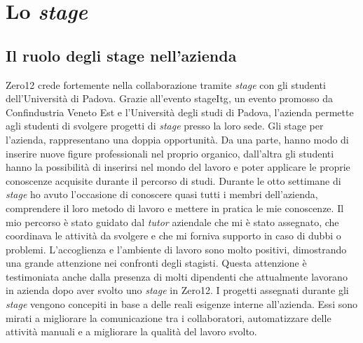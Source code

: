 
\chapter{Lo \textit{stage}}
\label{cap:lo-stage}



\section{Il ruolo degli stage nell'azienda}
Zero12 crede fortemente nella collaborazione tramite \textit{stage} con gli studenti dell'Università di Padova. Grazie all'evento \gls{stageItg}, un evento promosso da Confindustria Veneto Est e l'Università degli studi di Padova, l'azienda permette agli studenti di svolgere progetti di \textit{stage} presso la loro sede.
Gli stage per l'azienda, rappresentano una doppia opportunità. Da una parte, hanno modo di inserire nuove figure professionali nel proprio organico, dall’altra gli studenti hanno la possibilità di inserirsi nel mondo del lavoro e poter applicare le proprie conoscenze acquisite durante il percorso di studi.
Durante le otto settimane di \textit{stage} ho avuto l’occasione di conoscere quasi tutti i membri dell’azienda, comprendere il loro metodo di lavoro e mettere in pratica le mie conoscenze. Il mio percorso è stato guidato dal \textit{tutor} aziendale che mi è stato assegnato, che coordinava le attività da svolgere e che mi forniva supporto in caso di dubbi o problemi. 
L'accoglienza e l'ambiente di lavoro sono molto positivi, dimostrando una grande attenzione nei confronti degli stagisti. 
Questa attenzione è testimoniata anche dalla presenza di molti dipendenti che attualmente lavorano in azienda dopo aver svolto uno \textit{stage} in Zero12.
I progetti assegnati durante gli \textit{stage} vengono concepiti in base a delle reali esigenze interne all’azienda. Essi sono mirati a migliorare la comunicazione tra i collaboratori, automatizzare delle attività manuali e a migliorare la qualità del lavoro svolto.

